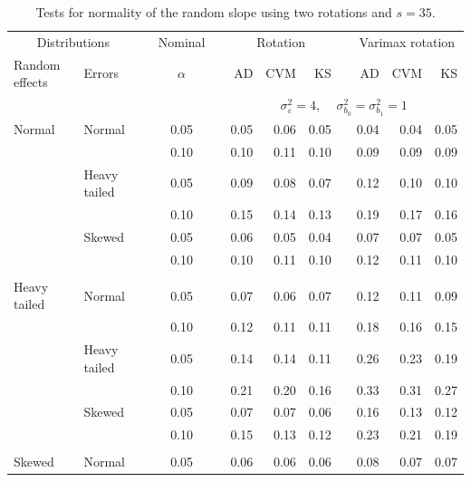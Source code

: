 \documentclass[12pt]{article} %
\begin{document}
\begin{table}[ht]
\caption{Tests for normality of the random slope using two rotations and $s = 35$.}
\begin{scriptsize}
\begin{center}
\begin{tabular}{ll p{.1cm} c p{.1cm} rrr p{.1cm} rrr}
  \hline
  \multicolumn{2}{c}{Distributions}& & Nominal & &  \multicolumn{3}{c}{Rotation} & & \multicolumn{3}{c}{Varimax rotation} \\ \cline{1-2} \cline{6-8} \cline{10-12}   
  Random effects & Errors & & $\alpha$ & & AD & CVM & KS & & AD & CVM & KS \\ 
   \hline
& && && \multicolumn{7}{c}{$\sigma_{\varepsilon}^2 = 4$, \ \ $\sigma_{b_0}^2 = \sigma_{b_1}^2 = 1$} \\ \cline{6-12}
\rowcolor{gray!20}Normal       & Normal       && 0.05 &&  0.05 & 0.06 & 0.05 && 0.04 & 0.04 & 0.05 \\ 
\rowcolor{gray!20}             &              && 0.10 &&  0.10 & 0.11 & 0.10 && 0.09 & 0.09 & 0.09 \\ 
\rowcolor{gray!20}             & Heavy tailed && 0.05 &&  0.09 & 0.08 & 0.07 && 0.12 & 0.10 & 0.10 \\ 
\rowcolor{gray!20}             &              && 0.10 &&  0.15 & 0.14 & 0.13 && 0.19 & 0.17 & 0.16 \\ 
\rowcolor{gray!20}             & Skewed       && 0.05 &&  0.06 & 0.05 & 0.04 && 0.07 & 0.07 & 0.05 \\ 
\rowcolor{gray!20}             &              && 0.10 &&  0.10 & 0.11 & 0.10 && 0.12 & 0.11 & 0.10 \\ 
             &&&&&&&&&&&\\
Heavy tailed & Normal       && 0.05 &&  0.07 & 0.06 & 0.07 && 0.12 & 0.11 & 0.09 \\ 
             &              && 0.10 &&  0.12 & 0.11 & 0.11 && 0.18 & 0.16 & 0.15 \\ 
             & Heavy tailed && 0.05 &&  0.14 & 0.14 & 0.11 && 0.26 & 0.23 & 0.19 \\ 
             &              && 0.10 &&  0.21 & 0.20 & 0.16 && 0.33 & 0.31 & 0.27 \\ 
             & Skewed       && 0.05 &&  0.07 & 0.07 & 0.06 && 0.16 & 0.13 & 0.12 \\ 
             &              && 0.10 &&  0.15 & 0.13 & 0.12 && 0.23 & 0.21 & 0.19 \\ 
             &&&&&&&&&&&\\
Skewed       & Normal       && 0.05 &&  0.06 & 0.06 & 0.06 && 0.08 & 0.07 & 0.07 \\ 

\end{tabular}
\end{center}
\end{scriptsize}
\end{table}
\end{document}
